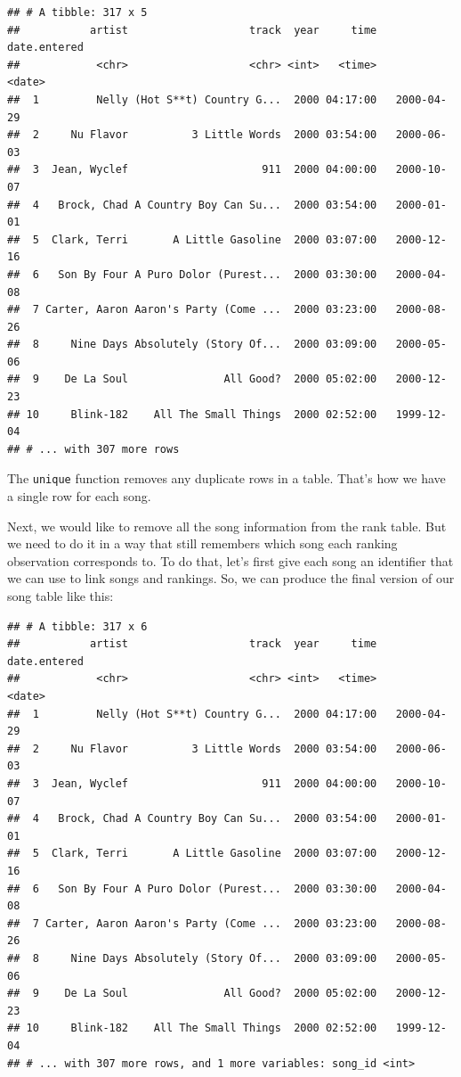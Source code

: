 \documentclass[]{article}
\newenvironment{Shaded}{\begin{snugshade}}{\end{snugshade}}
\newcommand{\KeywordTok}[1]{\textcolor[rgb]{0.13,0.29,0.53}{\textbf{{#1}}}}
\newcommand{\DataTypeTok}[1]{\textcolor[rgb]{0.13,0.29,0.53}{{#1}}}
\newcommand{\StringTok}[1]{\textcolor[rgb]{0.31,0.60,0.02}{{#1}}}
\newcommand{\NormalTok}[1]{{#1}}
\theoremstyle{definition}
\theoremstyle{definition}
\theoremstyle{remark}
\begin{document}
\begin{verbatim}
## # A tibble: 317 x 5
##           artist                   track  year     time date.entered
##            <chr>                   <chr> <int>   <time>       <date>
##  1         Nelly (Hot S**t) Country G...  2000 04:17:00   2000-04-29
##  2     Nu Flavor          3 Little Words  2000 03:54:00   2000-06-03
##  3  Jean, Wyclef                     911  2000 04:00:00   2000-10-07
##  4   Brock, Chad A Country Boy Can Su...  2000 03:54:00   2000-01-01
##  5  Clark, Terri       A Little Gasoline  2000 03:07:00   2000-12-16
##  6   Son By Four A Puro Dolor (Purest...  2000 03:30:00   2000-04-08
##  7 Carter, Aaron Aaron's Party (Come ...  2000 03:23:00   2000-08-26
##  8     Nine Days Absolutely (Story Of...  2000 03:09:00   2000-05-06
##  9    De La Soul               All Good?  2000 05:02:00   2000-12-23
## 10     Blink-182    All The Small Things  2000 02:52:00   1999-12-04
## # ... with 307 more rows
\end{verbatim}

The \texttt{unique} function removes any duplicate rows in a table.
That's how we have a single row for each song.

Next, we would like to remove all the song information from the rank
table. But we need to do it in a way that still remembers which song
each ranking observation corresponds to. To do that, let's first give
each song an identifier that we can use to link songs and rankings. So,
we can produce the final version of our song table like this:

\begin{Shaded}
\end{Shaded}

\begin{verbatim}
## # A tibble: 317 x 6
##           artist                   track  year     time date.entered
##            <chr>                   <chr> <int>   <time>       <date>
##  1         Nelly (Hot S**t) Country G...  2000 04:17:00   2000-04-29
##  2     Nu Flavor          3 Little Words  2000 03:54:00   2000-06-03
##  3  Jean, Wyclef                     911  2000 04:00:00   2000-10-07
##  4   Brock, Chad A Country Boy Can Su...  2000 03:54:00   2000-01-01
##  5  Clark, Terri       A Little Gasoline  2000 03:07:00   2000-12-16
##  6   Son By Four A Puro Dolor (Purest...  2000 03:30:00   2000-04-08
##  7 Carter, Aaron Aaron's Party (Come ...  2000 03:23:00   2000-08-26
##  8     Nine Days Absolutely (Story Of...  2000 03:09:00   2000-05-06
##  9    De La Soul               All Good?  2000 05:02:00   2000-12-23
## 10     Blink-182    All The Small Things  2000 02:52:00   1999-12-04
## # ... with 307 more rows, and 1 more variables: song_id <int>
\end{verbatim}
\end{document}
